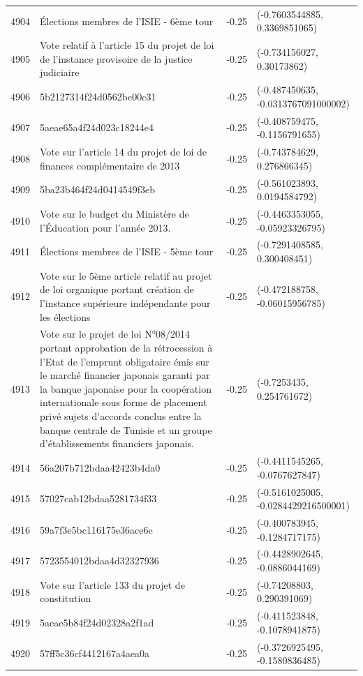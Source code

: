\begin{table}[ht]
\begin{tabular}{rlrl}
  4904 & Élections membres de l'ISIE - 6ème tour & -0.25 & (-0.7603544885, 0.3369851065) \\ 
  4905 & Vote relatif à l'article 15 du projet de loi de l'instance provisoire de la justice judiciaire & -0.25 & (-0.734156027, 0.30173862) \\ 
  4906 & 5b2127314f24d0562be00c31 & -0.25 & (-0.487450635, -0.0313767091000002) \\ 
  4907 & 5aeae65a4f24d023c18244e4 & -0.25 & (-0.408759475, -0.1156791655) \\ 
  4908 & Vote sur l'article 14 du projet de loi de finances complémentaire de 2013 & -0.25 & (-0.743784629, 0.276866345) \\ 
  4909 & 5ba23b464f24d0414549f3eb & -0.25 & (-0.561023893, 0.0194584792) \\ 
  4910 & Vote sur le budget du Ministère de l'Éducation pour l'année 2013. & -0.25 & (-0.4463353055, -0.05923326795) \\ 
  4911 & Élections membres de l'ISIE - 5ème tour & -0.25 & (-0.7291408585, 0.300408451) \\ 
  4912 & Vote sur le 5ème article relatif au projet de loi organique portant création de l'instance supérieure indépendante pour les élections & -0.25 & (-0.472188758, -0.06015956785) \\ 
  4913 & Vote sur le projet de loi N°08/2014 portant approbation de la rétrocession à l'Etat de l'emprunt obligataire émis sur le marché financier japonais garanti par la banque japonaise pour la coopération internationale sous forme de placement privé sujets d'accords conclus entre la banque centrale de Tunisie et un groupe d'établissements financiers japonais. & -0.25 & (-0.7253435, 0.254761672) \\ 
  4914 & 56a207b712bdaa42423b4da0 & -0.25 & (-0.4411545265, -0.0767627847) \\ 
  4915 & 57027cab12bdaa5281734f33 & -0.25 & (-0.5161025005, -0.0284429216500001) \\ 
  4916 & 59a7f3e5bc116175e36ace6e & -0.25 & (-0.400783945, -0.1284717175) \\ 
  4917 & 5723554012bdaa4d32327936 & -0.25 & (-0.4428902645, -0.0886044169) \\ 
  4918 & Vote sur l'article 133 du projet de constitution & -0.25 & (-0.74208803, 0.290391069) \\ 
  4919 & 5aeae5b84f24d02328a2f1ad & -0.25 & (-0.411523848, -0.1078941875) \\ 
  4920 & 57ff5c36cf4412167a4aea0a & -0.25 & (-0.3726925495, -0.1580836485) \\ 

\end{tabular}
\end{table}
